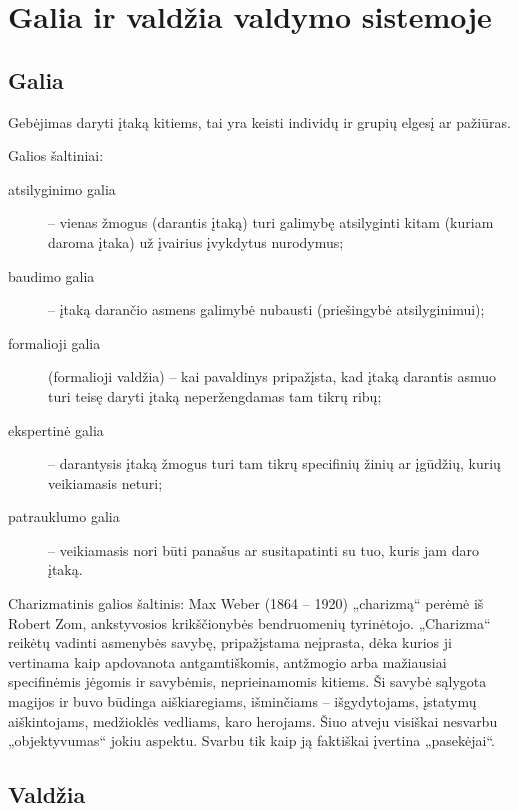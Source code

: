 \chapter{Galia ir valdžia valdymo sistemoje}

\section{Galia}

\begin{defn}[Galia]
  Gebėjimas daryti įtaką kitiems, tai yra keisti individų ir grupių
  elgesį ar pažiūras.
\end{defn}

Galios šaltiniai:
\begin{description}
  \item[atsilyginimo galia] – vienas žmogus (darantis įtaką) turi
    galimybę atsilyginti kitam (kuriam daroma įtaka) už įvairius
    įvykdytus nurodymus;
  \item[baudimo galia] – įtaką darančio asmens galimybė nubausti
    (priešingybė atsilyginimui);
  \item[formalioji galia] (formalioji valdžia) – kai pavaldinys
    pripažįsta, kad įtaką darantis asmuo turi teisę daryti įtaką
    neperžengdamas tam tikrų ribų;
  \item[ekspertinė galia] – darantysis įtaką žmogus turi tam tikrų
    specifinių žinių ar įgūdžių, kurių veikiamasis neturi;
  \item[patrauklumo galia] – veikiamasis nori būti panašus ar
    susitapatinti su tuo, kuris jam daro įtaką.
\end{description}

Charizmatinis galios šaltinis: Max Weber (1864 – 1920) „charizmą“ perėmė
iš Robert Zom, ankstyvosios krikščionybės bendruomenių tyrinėtojo.
„Charizma“ reikėtų vadinti asmenybės savybę, pripažįstama neįprasta,
dėka kurios ji vertinama kaip apdovanota antgamtiškomis, antžmogio
arba mažiausiai specifinėmis jėgomis ir savybėmis, neprieinamomis
kitiems. Ši savybė sąlygota magijos ir buvo būdinga aiškiaregiams,
išminčiams – išgydytojams, įstatymų aiškintojams, medžioklės vedliams,
karo herojams. Šiuo atveju visiškai nesvarbu „objektyvumas“ jokiu
aspektu. Svarbu tik kaip ją faktiškai įvertina „pasekėjai“.

\section{Valdžia}

